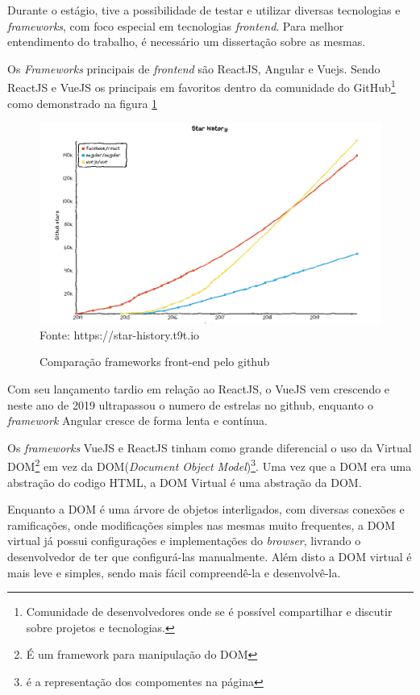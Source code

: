 Durante o estágio, tive a possibilidade de testar e utilizar diversas tecnologias e \textit{frameworks}, com foco especial em tecnologias \textit{frontend}.
Para melhor entendimento do trabalho, é necessário um dissertação sobre as mesmas.

Os \textit{Frameworks} principais de \textit{frontend} são ReactJS, Angular e Vuejs.
Sendo ReactJS e VueJS os principais em favoritos dentro da comunidade do GitHub\footnote{Comunidade de desenvolvedores onde se é possível compartilhar e discutir sobre projetos e tecnologias.} como demonstrado na figura \ref{fig:github}

\begin{figure}[H]
\centering
\caption{Comparação frameworks front-end pelo github} %
\includegraphics[scale=0.55]{githubFramework}\\  %
\label{fig:github} %
{\small Fonte: https://star-history.t9t.io} %
\end{figure}

Com seu lançamento tardio em relação ao ReactJS, o VueJS vem crescendo e neste ano de 2019 ultrapassou o numero de estrelas no github, enquanto o \textit{framework} Angular
 cresce de forma lenta e contínua.

Os \textit{frameworks} VueJS e ReactJS tinham como grande diferencial o uso da Virtual DOM\footnote{É um framework para manipulação do DOM} em vez da DOM(\textit{Document Object Model})\footnote{é a representação dos compomentes na página}. Uma vez que a DOM era uma abstração do codigo HTML, a DOM Virtual é uma abstração da DOM.

Enquanto a DOM é uma árvore de objetos interligados, com diversas conexões e ramificações, onde modificações simples nas mesmas muito frequentes, a DOM virtual já possui configurações e implementações do \textit{browser}, livrando o desenvolvedor de ter que configurá-las manualmente. Além disto a DOM virtual é mais leve e simples, sendo mais fácil compreendê-la e desenvolvê-la.

